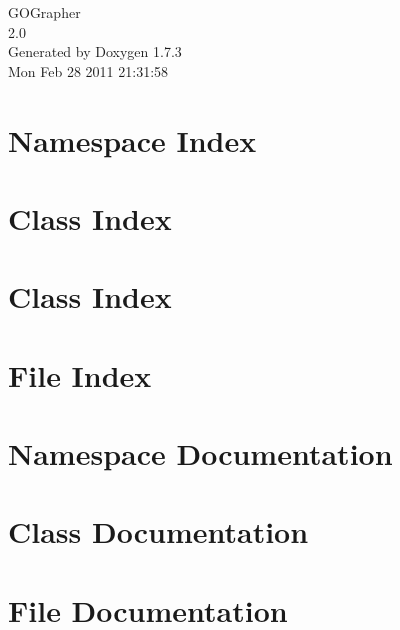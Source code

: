 \documentclass[a4paper]{book}
\begin{document}
\hypersetup{pageanchor=false}
\begin{titlepage}
\vspace*{7cm}
\begin{center}
{\Large GOGrapher \\[1ex]\large 2.0 }\\
\vspace*{1cm}
{\large Generated by Doxygen 1.7.3}\\
\vspace*{0.5cm}
{\small Mon Feb 28 2011 21:31:58}\\
\end{center}
\end{titlepage}
\clearemptydoublepage
{}
\tableofcontents
\clearemptydoublepage
{}
\hypersetup{pageanchor=true}
\chapter{Namespace Index}

\chapter{Class Index}

\chapter{Class Index}

\chapter{File Index}

\chapter{Namespace Documentation}







\chapter{Class Documentation}






\chapter{File Documentation}







\printindex
\end{document}
